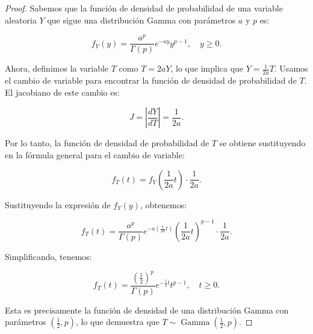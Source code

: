 \begin{proof}
	Sabemos que la función de densidad de probabilidad de una variable aleatoria \( Y \) que sigue una distribución Gamma con parámetros \( a \) y \( p \) es:

	\[
		f_{Y}(y) = \frac{a^{p}}{\Gamma(p)} e^{-a y} y^{p-1}, \quad y \geq 0.
	\]

	Ahora, definimos la variable \( T \) como \( T = 2a Y \), lo que implica que \(
	Y = \frac{1}{2a} T \). Usamos el cambio de variable para encontrar la función
	de densidad de probabilidad de \( T \). El jacobiano de este cambio es:

	\[
		J = \left| \frac{dY}{dT} \right| = \frac{1}{2a}.
	\]

	Por lo tanto, la función de densidad de probabilidad de \( T \) se obtiene
	sustituyendo en la fórmula general para el cambio de variable:

	\[
		f_{T}(t) = f_{Y}\left(\frac{1}{2a} t\right) \cdot \frac{1}{2a}.
	\]

	Sustituyendo la expresión de \( f_Y(y) \), obtenemos:

	\[
		f_{T}(t) = \frac{a^{p}}{\Gamma(p)} e^{-a \left(\frac{1}{2a} t\right)} \left( \frac{1}{2a} t \right)^{p-1} \cdot \frac{1}{2a}.
	\]

	Simplificando, tenemos:

	\[
		f_{T}(t) = \frac{\left( \frac{1}{2} \right)^{p}}{\Gamma(p)} e^{-\frac{1}{2} t} t^{p-1}, \quad t \geq 0.
	\]

	Esta es precisamente la función de densidad de una distribución Gamma con
	parámetros \( \left( \frac{1}{2}, p \right) \), lo que demuestra que \( T \sim
	\operatorname{Gamma}\left( \frac{1}{2}, p \right) \).
\end{proof}

